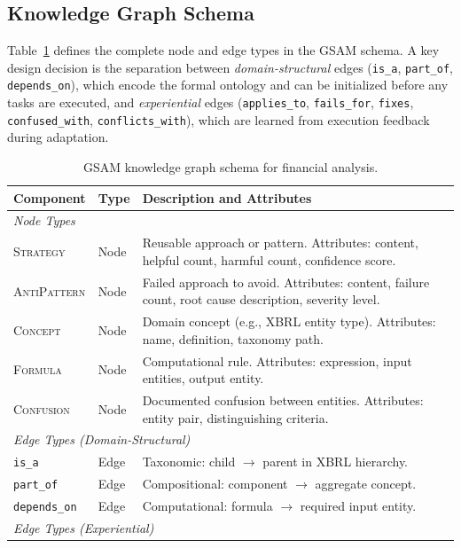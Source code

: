 \documentclass[12pt,a4paper,oneside]{article}
\begin{document}
\subsection{Knowledge Graph Schema}
\label{sec:schema}

Table~\ref{tab:schema} defines the complete node and edge types in the GSAM schema. A key design decision is the separation between \textit{domain-structural} edges (\texttt{is\_a}, \texttt{part\_of}, \texttt{depends\_on}), which encode the formal ontology and can be initialized before any tasks are executed, and \textit{experiential} edges (\texttt{applies\_to}, \texttt{fails\_for}, \texttt{fixes}, \texttt{confused\_with}, \texttt{conflicts\_with}), which are learned from execution feedback during adaptation.

\begin{table}[H]
\centering
\caption{GSAM knowledge graph schema for financial analysis.}
\label{tab:schema}
\small
\begin{tabular}{@{}llp{7cm}@{}}
\toprule
\textbf{Component} & \textbf{Type} & \textbf{Description and Attributes} \\
\midrule
\multicolumn{3}{l}{\textit{Node Types}} \\
\midrule
\textsc{Strategy} & Node & Reusable approach or pattern. Attributes: content, helpful count, harmful count, confidence score. \\
\textsc{AntiPattern} & Node & Failed approach to avoid. Attributes: content, failure count, root cause description, severity level. \\
\textsc{Concept} & Node & Domain concept (e.g., XBRL entity type). Attributes: name, definition, taxonomy path. \\
\textsc{Formula} & Node & Computational rule. Attributes: expression, input entities, output entity. \\
\textsc{Confusion} & Node & Documented confusion between entities. Attributes: entity pair, distinguishing criteria. \\
\midrule
\multicolumn{3}{l}{\textit{Edge Types (Domain-Structural)}} \\
\midrule
\texttt{is\_a} & Edge & Taxonomic: child $\rightarrow$ parent in XBRL hierarchy. \\
\texttt{part\_of} & Edge & Compositional: component $\rightarrow$ aggregate concept. \\
\texttt{depends\_on} & Edge & Computational: formula $\rightarrow$ required input entity. \\
\midrule
\multicolumn{3}{l}{\textit{Edge Types (Experiential)}} \\

\end{tabular}
\end{table}
\end{document}
